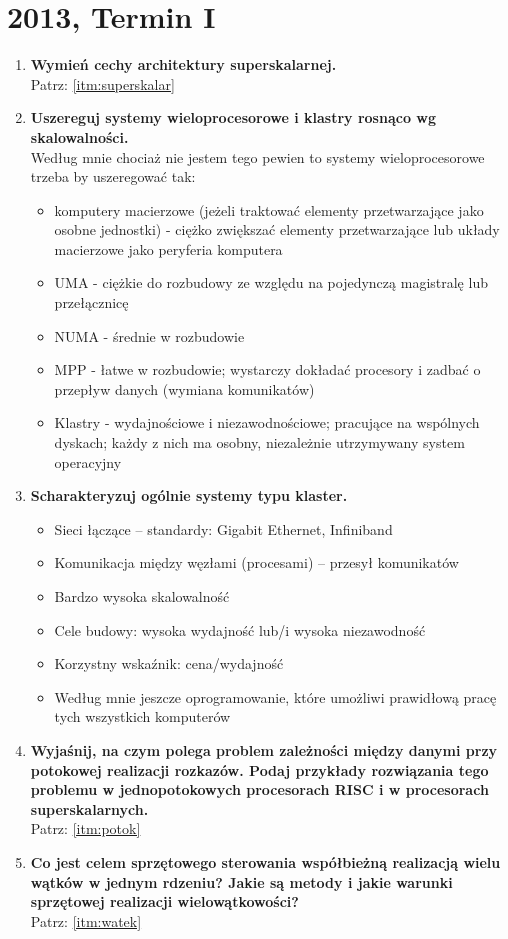 	\section{2013, Termin I}
		\begin{enumerate}	
			\item \textbf{Wymień cechy architektury superskalarnej.}\\
			Patrz: \ref{itm:superskalar}
			\item \textbf{Uszereguj systemy wieloprocesorowe i klastry rosnąco wg skalowalności.}\\
			Według mnie chociaż nie jestem tego pewien to systemy wieloprocesorowe trzeba by uszeregować tak:
			\begin{itemize}
				\item komputery macierzowe (jeżeli traktować elementy przetwarzające jako osobne jednostki) - ciężko zwiększać elementy przetwarzające lub układy macierzowe jako peryferia komputera
				\item UMA - ciężkie do rozbudowy ze względu na pojedynczą magistralę lub przełącznicę
				\item NUMA - średnie w rozbudowie
				\item MPP - łatwe w rozbudowie; wystarczy dokładać procesory i zadbać o przepływ danych (wymiana komunikatów)
				\item Klastry - wydajnościowe i niezawodnościowe; pracujące na wspólnych dyskach; każdy z nich ma osobny, niezależnie utrzymywany system operacyjny
			\end{itemize}
			\item \textbf{Scharakteryzuj ogólnie systemy typu klaster.}
			\begin{itemize}
				\item Sieci łączące – standardy: Gigabit Ethernet, Infiniband
				\item Komunikacja między węzłami (procesami) – przesył komunikatów
				\item Bardzo wysoka skalowalność
				\item Cele budowy: wysoka wydajność lub/i wysoka niezawodność
				\item Korzystny wskaźnik: cena/wydajność
				\item Według mnie jeszcze oprogramowanie, które umożliwi prawidłową pracę tych wszystkich komputerów
			\end{itemize}
			\item \textbf{Wyjaśnij, na czym polega problem zależności między danymi przy potokowej realizacji rozkazów. Podaj przykłady rozwiązania tego problemu w jednopotokowych procesorach RISC i w procesorach superskalarnych.}\\
			Patrz: \ref{itm:potok}
			
			\item \textbf{Co jest celem sprzętowego sterowania współbieżną realizacją wielu wątków w jednym rdzeniu? Jakie są metody i jakie warunki sprzętowej realizacji wielowątkowości?}\\
			Patrz: \ref{itm:watek}
		\end{enumerate}
		
